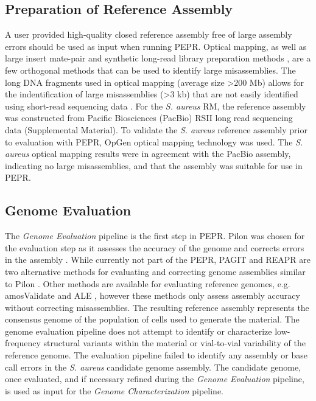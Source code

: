 \documentclass[smallextended]{svjour3}\usepackage[]{graphicx}\usepackage[]{color}
\begin{document}
\subsection{Preparation of Reference Assembly} 
A user provided high-quality closed reference assembly free of large assembly errors should be used as input when running PEPR. 
Optical mapping, as well as large insert mate-pair and synthetic long-read library preparation methods \cite{McCoy2014}, are a few orthogonal methods that can be used to identify large misassemblies. 
The long DNA fragments used in optical mapping (average size \textgreater 200 Mb) allows for the indentification of large misassemblies (\textgreater 3 kb) that are not easily identified using short-read sequencing data \cite{Mendelowitz2014}. 
For the \textit{S. aureus} RM, the reference assembly was constructed from Pacific Biosciences (PacBio) RSII long read sequencing data (Supplemental Material).
To validate the \textit{S. aureus} reference assembly prior to evaluation with PEPR, OpGen optical mapping technology was used. 
The \textit{S. aureus} optical mapping results were in agreement with the  PacBio assembly, indicating no large misassemblies, and that the assembly was suitable for use in PEPR. 


\subsection{Genome Evaluation}
The \textit{Genome Evaluation} pipeline is the first step in PEPR. 
Pilon was chosen for the evaluation step as it assesses the accuracy of the genome and corrects errors in the assembly \cite{Walker2014}. 
While currently not part of the PEPR, PAGIT and REAPR are two alternative methods for evaluating and correcting genome assemblies similar to Pilon \cite{Swain2012,Hunt2013}. 
Other methods are available for evaluating reference genomes, e.g. amosValidate \cite{Phillippy2008} and ALE \cite{Clark2013}, however these methods only assess assembly accuracy without correcting misassemblies. 
The resulting reference assembly represents the consensus genome of the population of cells used to generate the material. 
The genome evaluation pipeline does not attempt to identify or characterize low-frequency structural variants within the material or vial-to-vial variability of the reference genome. 
The evaluation pipeline failed to identify any assembly or base call errors in the \textit{S. aureus} candidate genome assembly. 
The candidate genome, once evaluated, and if necessary refined during the \textit{Genome Evaluation} pipeline, is used as input for the \textit{Genome Characterization} pipeline. 
\end{document}
